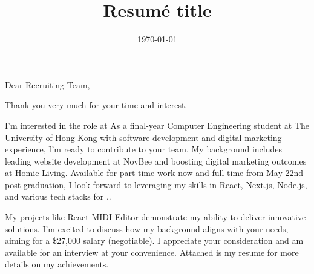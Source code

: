 \documentclass[11pt,a4paper,roman]{moderncv}        %
\title{Resumé title}                               %
\newcommand{\companyname}[1]{\renewcommand{\companyname}{#1}}
\newcommand{\posttitle}[1]{\renewcommand{\posttitle}{#1}}
\newcommand{\reason}[1]{\renewcommand{\reason}{#1}}
\begin{document}
\date{\today}
\opening{Dear Recruiting Team,}
\closing{Thank you very much for your time and interest.}


\makelettertitle
I'm interested in the \posttitle \ role at \companyname. As a final-year Computer Engineering student at The University of Hong Kong with software development and digital marketing experience, I'm ready to contribute to your team. My background includes leading website development at NovBee and boosting digital marketing outcomes at Homie Living. Available for part-time work now and full-time from May 22nd post-graduation, I look forward to leveraging my skills in React, Next.js, Node.js, and various tech stacks for \companyname.

My projects like React MIDI Editor demonstrate my ability to deliver innovative solutions. \reason \ I'm excited to discuss how my background aligns with your needs, aiming for a \$27,000 salary (negotiable). I appreciate your consideration and am available for an interview at your convenience. Attached is my resume for more details on my achievements.

\vspace{0.5cm}


\makeletterclosing
\end{document}

